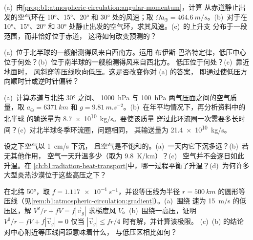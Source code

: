 \begin{exercise}[$\star\star$]\label{exo:b1:atmospheric-circulation:6}
(a)~由\cref{prop:b1:atmospheric-circulation:angular-momentum}，计算
从赤道静止出发的空气环在 \ang{10}、\ang{15}、\ang{20} 和
\ang{30} 处的风速；取 $\Omega a_\oplus = \qty{464.6}{m/s}$。(b)~对于在
\ang{10}、\ang{15}、\ang{20} 和 \ang{30} 处静止出发的空气环，求其风速。(c)~的上升支
分布于一段范围，而非恰好位于赤道，
这将如何改变预测的？
\end{exercise}

\begin{exercise}[$\star\star$]\label{exo:b1:atmospheric-circulation:7}
(a)~位于北半球的一艘船测得风来自西南方。运用
布伊斯-巴洛特定律，低压中心位于何处？(b)~位于南半球的一艘船测得风来自西北方。
低压位于何处？(c)~靠近地面时，
风斜穿等压线吹向低压。这是否改变你对 (a) 的答案，
即通过使低压方向顺时针或逆时针偏转？
\end{exercise}

\begin{exercise}[$\star\star$]\label{exo:b1:atmospheric-circulation:8}
(a)~计算赤道与北纬 \ang{30} 之间、
\qty{1000}{hPa} 与 \qty{100}{hPa} 两气压面之间的空气质量，取 $a_\oplus = \qty{6371}{km}$ 和
$g = \qty{9.81}{m.s^{-2}}$。(b)~在年平均情况下，再分析资料中的北半球
的输送量为 \qty{8.7e10}{kg/s}。要使该质量
穿过此环流圈一次需要多长时间？(c)~对北半球冬季环流圈，问题相同，
其输送量为 \qty{21.4e10}{kg/s}。
\end{exercise}

\begin{exercise}[$\star\star$]\label{exo:b1:atmospheric-circulation:9}
设之下空气以 \qty{1}{cm/s} 下沉，
且空气是不饱和的。(a)~一天内它下沉多远？(b)~若无其他作用，
空气一天升温多少（取为 \qty{9.8}{K/km}）？(c)~
空气并不会逐日如此升温。在
\cref{ch:b1:radiation-heat-transport}中，哪一过程平衡了升温？(d)~为何许多
大型炎热沙漠位于这些高压之下？
\end{exercise}

\begin{exercise}[$\star\star\star$]\label{exo:b1:atmospheric-circulation:10}
在北纬 \ang{50}，取 $f = \qty{1.117e-4}{s^{-1}}$，并设等压线为半径
$r = \qty{500}{km}$ 的圆形等压线（见\cref{rem:b1:atmospheric-circulation:gradient}）。(a)~围绕
速为 \qty{15}{m/s} 的低压区，解 $V^2/r + fV =
f|\vec v_g|$ 求梯度风 $V$。(b)~围绕一高压，证明 $V^2/r - fV + f
|\vec v_g| = 0$ 仅当 $|\vec v_g| \leq fr/4$ 时有解，并计算该极限。
(c)~(b) 的结论对中心附近等压线间距意味着什么，
与低压区相比如何？
\end{exercise}


